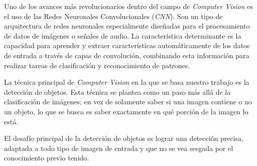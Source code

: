\documentclass[a4paper]{article}
\begin{document}
Uno de los avances más revolucionarios dentro del campo de \textit{Computer Vision} es el uso de las Redes Neuronales Convolucionales (\textit{CNN}). Son un tipo de arquitectura de redes neuronales especialmente diseñadas para el procesamiento de datos de imágenes o señales de audio. La característica determinante es la capacidad para aprender y extraer características automáticamente de los datos de entrada a través de capas de convolución, combinando esta información para realizar tareas de clasificación y reconocimiento de patrones.

La técnica principal de \textit{Computer Vision} en la que se basa nuestro trabajo es la detección de objetos. Esta técnica se plantea como un paso más allá de la clasificación de imágenes; en vez de solamente saber si una imagen contiene o no un objeto, lo que se busca es saber exactamente en qué porción de la imagen lo está.

\begin{figure}[H]
\end{figure}

El desafío principal de la detección de objetos es lograr una detección precisa, adaptada a todo tipo de imagen de entrada y que no se vea sesgada por el conocimiento previo tenido.
\end{document}
